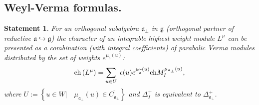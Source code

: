 \documentclass[12pt]{article}
\newtheorem{statement}{Statement}
\theoremstyle{definition}
\newcommand{\gf}{\mathfrak{g}}
\newcommand{\af}{\mathfrak{a}}
\newcommand{\aft}{\widetilde{\mathfrak{a}}}
\newcommand{\afb}{\mathfrak{a}_{\bot}}
\begin{document}
\subsection{Weyl-Verma formulas.}

\begin{statement}
\bigskip For an orthogonal subalgebra $\afb$ in $\gf$
(orthogonal partner of reductive $\af\hookrightarrow \gf$) the
character of an integrable highest weight module $L^{\mu }$ can be presented
as a combination (with integral coefficients) of parabolic Verma modules
distributed by the set of weights $e^{\mu _{\aft}\left( u\right) }$:
\begin{equation*}
\mathrm{ch}\left( L^{\mu }\right) =\sum_{u\in U}\;\epsilon (u)e^{\mu _{%
\widetilde{\af}}\left( u\right) }\mathrm{ch}M_{I}^{\mu _{\af%
_{\perp }}\left( u\right) },
\end{equation*}
where $U:=\left\{ u\in W|\quad \mu _{\afb}\left( u\right) \in
\overline{C_{\afb}}\right\} $ and $\Delta _{I}^{+}$ is
equivalent to $\Delta _{\afb}^{+}$.
\end{statement}
\end{document}
